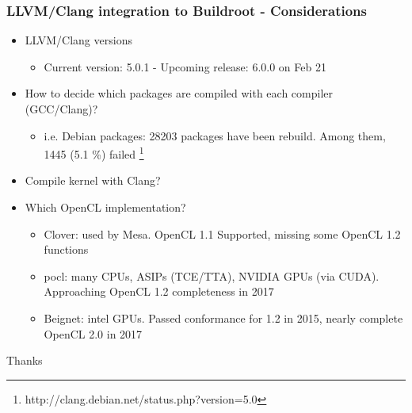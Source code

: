 \documentclass{beamer}
\begin{document}
\begin{frame}
\frametitle{LLVM/Clang integration to Buildroot - Considerations}
\begin{itemize}
  \item LLVM/Clang versions
  \begin{itemize}
    \item Current version: 5.0.1 - Upcoming release: 6.0.0 on Feb 21
  \end{itemize}
  \item How to decide which packages are compiled with each compiler (GCC/Clang)?
  \begin{itemize}
    \item i.e. Debian packages: 28203 packages have been rebuild. Among them, 1445 (5.1 \%) failed \footnote{http://clang.debian.net/status.php?version=5.0}
  \end{itemize}
  \item Compile kernel with Clang?
  \item Which OpenCL implementation?
  \begin{itemize}
    \item {\selectfont Clover}: used by Mesa. OpenCL 1.1 Supported, missing some OpenCL 1.2 functions
    \item {\selectfont pocl}: many CPUs, ASIPs (TCE/TTA), NVIDIA GPUs (via CUDA). Approaching OpenCL 1.2 completeness in 2017
    \item {\selectfont Beignet}: intel GPUs. Passed conformance for 1.2 in 2015, nearly complete OpenCL 2.0 in 2017
  \end{itemize}
\end{itemize}
\end{frame}
\begin{frame}
\Huge{\centerline{Thanks}}
\end{frame}
\end{document}
